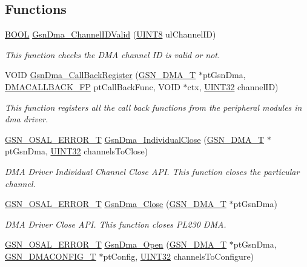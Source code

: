 \subsection*{Functions}
\begin{DoxyCompactItemize}
\item 
\hyperlink{a00660_ga1f04022c0a182c51c059438790ea138c}{BOOL} \hyperlink{a00645_ga5ceeca071a5842ca89987a6409d7622f}{GsnDma\_\-ChannelIDValid} (\hyperlink{a00660_gab27e9918b538ce9d8ca692479b375b6a}{UINT8} ulChannelID)
\begin{DoxyCompactList}\small\item\em This function checks the DMA channel ID is valid or not. \end{DoxyCompactList}\item 
VOID \hyperlink{a00645_ga449241f212ec11818862d4b3d09f78e4}{GsnDma\_\-CallBackRegister} (\hyperlink{a00049}{GSN\_\-DMA\_\-T} $\ast$ptGsnDma, \hyperlink{a00484_a74d23c3cb3acf00134600795aef55b6e}{DMACALLBACK\_\-FP} ptCallBackFunc, VOID $\ast$ctx, \hyperlink{a00660_gae1e6edbbc26d6fbc71a90190d0266018}{UINT32} channelID)
\begin{DoxyCompactList}\small\item\em This function registers all the call back functions from the peripheral modules in dma driver. \end{DoxyCompactList}\item 
\hyperlink{a00659_ga36216a7aacd1d5024bc7b8bf39c3f46b}{GSN\_\-OSAL\_\-ERROR\_\-T} \hyperlink{a00645_ga562863c56fadab4dacb22c1701a44f7b}{GsnDma\_\-IndividualClose} (\hyperlink{a00049}{GSN\_\-DMA\_\-T} $\ast$ptGsnDma, \hyperlink{a00660_gae1e6edbbc26d6fbc71a90190d0266018}{UINT32} channelsToClose)
\begin{DoxyCompactList}\small\item\em DMA Driver Individual Channel Close API. This function closes the particular channel. \end{DoxyCompactList}\item 
\hyperlink{a00659_ga36216a7aacd1d5024bc7b8bf39c3f46b}{GSN\_\-OSAL\_\-ERROR\_\-T} \hyperlink{a00645_ga5aa9630791f923d9584eca792db30693}{GsnDma\_\-Close} (\hyperlink{a00049}{GSN\_\-DMA\_\-T} $\ast$ptGsnDma)
\begin{DoxyCompactList}\small\item\em DMA Driver Close API. This function closes PL230 DMA. \end{DoxyCompactList}\item 
\hyperlink{a00659_ga36216a7aacd1d5024bc7b8bf39c3f46b}{GSN\_\-OSAL\_\-ERROR\_\-T} \hyperlink{a00645_gac9b681a85c07c6f76d4a5b5c3578770d}{GsnDma\_\-Open} (\hyperlink{a00049}{GSN\_\-DMA\_\-T} $\ast$ptGsnDma, \hyperlink{a00053}{GSN\_\-DMACONFIG\_\-T} $\ast$ptConfig, \hyperlink{a00660_gae1e6edbbc26d6fbc71a90190d0266018}{UINT32} channelsToConfigure)

\end{DoxyCompactItemize}
